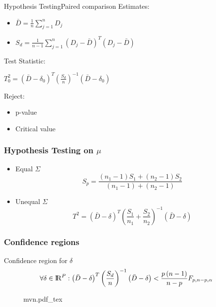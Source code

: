 \documentclass[aspectratio=169,10pt,t]{beamer}
\begin{document}
\begin{frame}{Hypothesis Testing}{Paired comparison}
	Estimates: \\
	\begin{itemize}
		\item $\bar{D} = \frac{1}{n} \sum^n_{j=1} D_j$ 
		\item $S_d = \frac{1}{n-1} \sum^n_{j=1} \left(D_j - \bar{D} \right)^T \left(D_j - \bar{D} \right)$ 
	\end{itemize}
	Test Statistic: \\
	\begin{center}
		\quad $T_0^2 = \left( \bar{D} - \delta_0 \right)^T \left( \frac{S_d}{n}  \right) ^{-1} \left( \bar{D} - \delta_0 \right)$ \\
	\end{center}
	Reject: \\
	\begin{itemize}
		\item p-value
		\item Critical value
	\end{itemize}
\end{frame}

\begin{frame}[t]
	\frametitle{Hypothesis Testing on $\mu$}
	\begin{itemize}
		\item Equal $\Sigma$\\
			\[
				S_p = 
				\frac{  \left( n_1 -1  \right) S_1 +  \left( n_2 -1  \right) S_2}
				{ \left( n_1 -1  \right) +  \left( n_2 -1  \right) } 
			\] 
		\item Unequal $\Sigma$
			\[
				T^{2} =
				\left( \bar{D} - \delta  \right) ^{T}
				\left( \frac{S_1}{n_1} + \frac{S_2}{n_2}  \right) ^{-1}
				\left( \bar{D} - \delta  \right)
			\] 
	\end{itemize}
\end{frame}
\begin{frame}[t]
	\frametitle{Confidence regions}
	Confidence region for $\delta$
	\[
		\forall \delta \in {\rm I\!R}^{P}:
		\left( \bar{D} - \delta  \right) ^{T}
		\left( \frac{S_d}{n}  \right) ^{-1}
		\left( \bar{D} - \delta  \right)
		<
		\frac{p  \left( n-1 \right) }{n-p} 
		F_{p,n-p,\alpha}
	\] 
	\begin{figure}[h]
		\centering
		{mvn.pdf_tex}
	\end{figure}
\end{frame}
\end{document}
